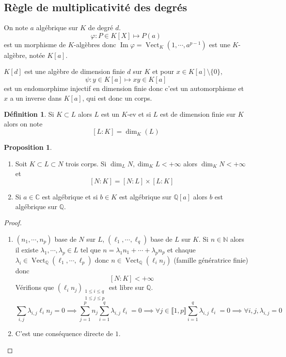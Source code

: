 \documentclass{article}
\theoremstyle{definition}
\newtheorem*{dfn}{Définition}
\newtheorem*{prop}{Proposition}
\DeclareMathOperator{\Vect}{Vect}
\DeclareMathOperator{\img}{Im}
\begin{document}
\subsection{Règle de multiplicativité des degrés}

On note $a$ algébrique sur $K$ de degré $d$. \[
    \varphi: P\in K[X] \longmapsto P(a)
\]
est un morphisme de $K$-algèbres donc $\img\varphi=\Vect_K(1, \cdots, a^{p-1})$ est une $K$-algèbre, notée $K[a]$.

$K[d]$ est une algèbre de dimension finie $d$ sur $K$ et pour $x\in K[a]\setminus \{0\}$, \[
    \psi: y\in K[a]\longmapsto xy\in K[a]
\]
est un endomorphime injectif en dimension finie donc c'est un automorphisme et $x$ a un inverse dans $K[a]$, qui est donc un corps.

\begin{dfn}
Si $K\subset L$ alors $L$ est un $K$-ev et si $L$ est de dimension finie sur $K$ alors on note \[
    [L:K]=\dim_K(L)
\]
\end{dfn}

\begin{prop}
\begin{enumerate}
    \item Soit $K\subset L\subset N$ trois corps. Si $\dim_L N, \dim_K L<+\infty$ alors $\dim_K N<+\infty$ et \[
        [N:K]=[N:L]\times [L:K]
    \]
    \item Si $a\in\mathbb C$ est algébrique et si $b\in K$ est algébrique sur $\mathbb Q[a]$ alors $b$ est algébrique sur $\mathbb Q$.
\end{enumerate}
\end{prop}

\begin{proof} ~
\begin{enumerate}
    \item $(n_1, \cdots, n_p)$ base de $N$ sur $L$, $(\ell_1, \cdots, \ell_q)$ base de $L$ sur $K$. Si $n\in\mathbb N$ alors il existe $\lambda_1, \cdots, \lambda_p\in L$ tel que $n=\lambda_1n_1+\cdots+\lambda_p n_p$ et chaque $\lambda_i\in\Vect_{\mathbb Q}(\ell_1, \cdots, \ell_p)$ donc $n\in\Vect_{\mathbb Q}(\ell_in_j)$ (famille génératrice finie) donc \[
        [N:K]<+\infty
    \]
    Vérifions que $(\ell_in_j)_{\substack{1\leq i\leq q\\ 1\leq j\leq p}}$ est libre sur $\mathbb Q$. \[
        \sum_{i, j}\lambda_{i, j}\ell_in_j=0\implies \sum_{j=1}^pn_j\sum_{i=1}^q\lambda_{i, j}\ell_i=0 \implies \forall j\in\llbracket 1, p\rrbracket \sum_{i=1}^q\lambda_{i, j}\ell_i=0\implies \forall i, j, \lambda_{i, j}=0
    \]
    \item C'est une conséquence directe de $1.$
\end{enumerate}
\end{proof}
\end{document}
